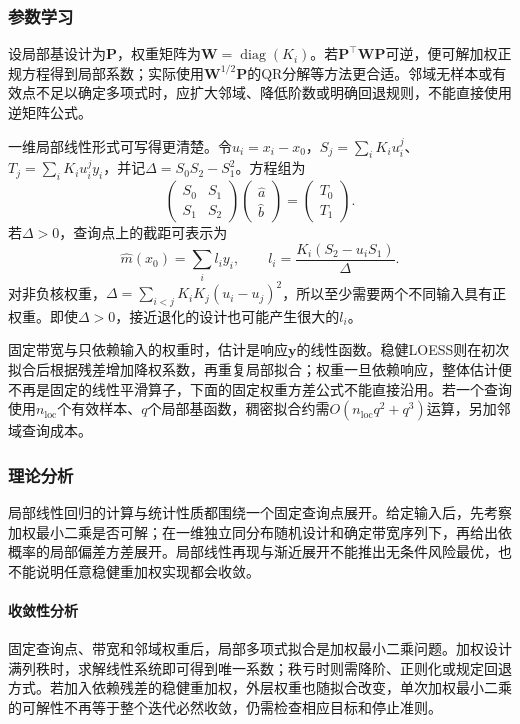 \subsubsection{参数学习}

设局部基设计为$\bm{P}$，权重矩阵为$\bm{W}=\operatorname{diag}(K_i)$。若$\bm{P}^{\top}\bm{W}\bm{P}$可逆，便可解加权正规方程得到局部系数；实际使用$\bm{W}^{1/2}\bm{P}$的QR分解等方法更合适。邻域无样本或有效点不足以确定多项式时，应扩大邻域、降低阶数或明确回退规则，不能直接使用逆矩阵公式。

一维局部线性形式可写得更清楚。令$u_i=x_i-x_0$，$S_j=\sum_iK_iu_i^j$、$T_j=\sum_iK_iu_i^jy_i$，并记$\Delta=S_0S_2-S_1^2$。方程组为
\[
  \begin{pmatrix}S_0&S_1\\S_1&S_2\end{pmatrix}
  \begin{pmatrix}\widehat a\\\widehat b\end{pmatrix}
  =\begin{pmatrix}T_0\\T_1\end{pmatrix}.
\]
若$\Delta>0$，查询点上的截距可表示为
\begin{equation}
  \widehat m(x_0)=\sum_i l_i y_i,\qquad
  l_i=\frac{K_i(S_2-u_iS_1)}{\Delta}.
  \label{eq:regression-local-linear-weights}
\end{equation}
对非负核权重，$\Delta=\sum_{i<j}K_iK_j(u_i-u_j)^2$，所以至少需要两个不同输入具有正权重。即使$\Delta>0$，接近退化的设计也可能产生很大的$l_i$。

固定带宽与只依赖输入的权重时，估计是响应$\bm{y}$的线性函数。稳健LOESS则在初次拟合后根据残差增加降权系数，再重复局部拟合；权重一旦依赖响应，整体估计便不再是固定的线性平滑算子，下面的固定权重方差公式不能直接沿用。若一个查询使用$n_{\mathrm{loc}}$个有效样本、$q$个局部基函数，稠密拟合约需$O(n_{\mathrm{loc}}q^2+q^3)$运算，另加邻域查询成本。

\subsubsection{理论分析}
\label{sec:regression-loess-theory}

局部线性回归的计算与统计性质都围绕一个固定查询点展开。给定输入后，先考察加权最小二乘是否可解；在一维独立同分布随机设计和确定带宽序列下，再给出依概率的局部偏差方差展开。局部线性再现与渐近展开不能推出无条件风险最优，也不能说明任意稳健重加权实现都会收敛。

\paragraph{收敛性分析}
固定查询点、带宽和邻域权重后，局部多项式拟合是加权最小二乘问题。加权设计满列秩时，求解线性系统即可得到唯一系数；秩亏时则需降阶、正则化或规定回退方式。若加入依赖残差的稳健重加权，外层权重也随拟合改变，单次加权最小二乘的可解性不再等于整个迭代必然收敛，仍需检查相应目标和停止准则。


